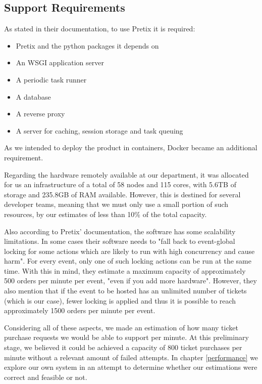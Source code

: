 \documentclass[12pt]{article}
\begin{document}
\subsection{Support Requirements} \label{pretix.requirements} %


As stated in their documentation, to use Pretix it is required:
\vspace{-10pt}
\begin{itemize}[noitemsep]
  \item Pretix and the python packages it depends on
  \item An WSGI application server
  \item A periodic task runner
  \item A database
  \item A reverse proxy
  \item A server for caching, session storage and task queuing
\end{itemize}
\vspace{-10pt}
As we intended to deploy the product in containers, Docker became an additional requirement.

Regarding the hardware remotely available at our department, it was allocated for us an infrastructure of a total of 58 nodes and 115 cores, with 5.6TB of 
storage and 235.8GB of RAM available.
However, this is destined for several developer teams, meaning that we must only use a small portion of such resources, by our estimates of less than 10\% of 
the total capacity.

Also according to Pretix' documentation, the software has some scalability limitations.
In some cases their software needs to "fall back to event-global locking for some actions which are likely to run with high concurrency and cause harm".
For every event, only one of such locking actions can be run at the same time.
With this in mind, they estimate a maximum capacity of approximately 500 orders per minute per event, "even if you add more hardware".
However, they also mention that if the event to be hosted has an unlimited number of tickets (which is our case), fewer locking is applied and thus it is 
possible to reach approximately 1500 orders per minute per event.

Considering all of these aspects, we made an estimation of how many ticket purchase requests we would be able to support per minute.
At this preliminary stage, we believed it could be achieved a capacity of 800 ticket purchases per minute without a relevant amount of failed attempts.
In chapter \ref{performance} we explore our own system in an attempt to determine whether our estimations were correct and feasible or not.
\end{document}

